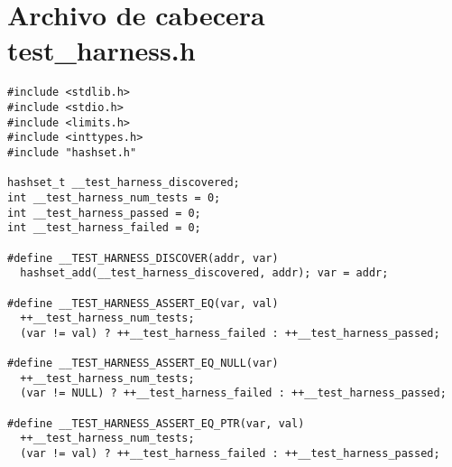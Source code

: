 \chapter{Archivo de cabecera test\_harness.h}
\label{ap:header_test_harness}

\begin{lstlisting}[mathescape=true]
#include <stdlib.h>
#include <stdio.h>
#include <limits.h>
#include <inttypes.h>
#include "hashset.h"

hashset_t __test_harness_discovered;
int __test_harness_num_tests = 0;
int __test_harness_passed = 0;
int __test_harness_failed = 0;

#define __TEST_HARNESS_DISCOVER(addr, var)
  hashset_add(__test_harness_discovered, addr); var = addr;

#define __TEST_HARNESS_ASSERT_EQ(var, val)
  ++__test_harness_num_tests;
  (var != val) ? ++__test_harness_failed : ++__test_harness_passed;

#define __TEST_HARNESS_ASSERT_EQ_NULL(var)
  ++__test_harness_num_tests;
  (var != NULL) ? ++__test_harness_failed : ++__test_harness_passed;

#define __TEST_HARNESS_ASSERT_EQ_PTR(var, val)
  ++__test_harness_num_tests;
  (var != val) ? ++__test_harness_failed : ++__test_harness_passed;
\end{lstlisting}
